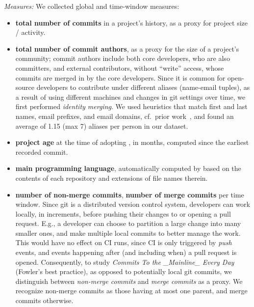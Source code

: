 \smallskip\noindent\emph{Measures:}
We collected global and time-window measures: 
\begin{itemize}

\item \textbf{total number of commits} in a project's history, as a proxy for 
project size / activity.

\item \textbf{total number of commit authors}, as a proxy for the size of a
project's community; commit authors include both core developers, who are
also committers, and external contributors, without ``write'' access, whose 
commits are merged in by the core developers.
Since it is common for open-source developers to contribute under different 
aliases (name-email tuples), \eg as a result of using different machines and 
changes in git settings over time, we first performed \emph{identity merging}.
We used heuristics that match first and last names, email prefixes, and email 
domains, cf.\ prior work~\cite{bird2006mining, vasilescu2015msrdata}, and
found an average of 1.15 (max 7) aliases per person in our dataset.

\item \textbf{project age} at the time of adopting \Tvis, in months, computed
since the earliest recorded commit.

\item \textbf{main programming language}, automatically computed by \GH
based on the contents of each repository and extensions of file names therein.

\item \textbf{number of non-merge commits}, \textbf{number of merge commits} 
per time window.
Since git is a distributed version control system, developers can work locally,
in increments, before pushing their changes to \GH or opening a pull request.
E.g., a developer can choose to partition a large change into many smaller 
ones, and make multiple local commits to better manage the work.
This would have no effect on CI runs, since CI is only triggered by \GH 
\emph{push} events, and events happening after (and including when) a pull 
request is opened.
Consequently, to study \emph{Commits To the \_Mainline\_ Every Day}
(Fowler's best practice), as opposed to potentially local git commits, we
distinguish between \emph{non-merge commits} and \emph{merge commits}
as a proxy.
We recognize non-merge commits as those having at most one parent, and
merge commits otherwise.


\end{itemize}
